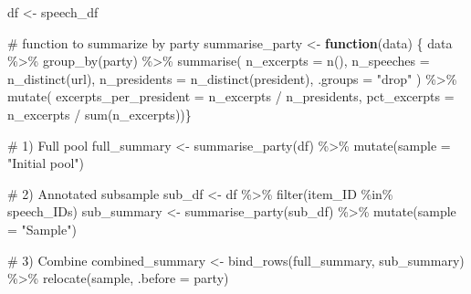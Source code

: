 \documentclass[
  man]{apa7}
\newenvironment{Shaded}{\begin{snugshade}}{\end{snugshade}}
\newcommand{\AttributeTok}[1]{\textcolor[rgb]{0.40,0.45,0.13}{#1}}
\newcommand{\CommentTok}[1]{\textcolor[rgb]{0.37,0.37,0.37}{#1}}
\newcommand{\ControlFlowTok}[1]{\textcolor[rgb]{0.00,0.23,0.31}{\textbf{#1}}}
\newcommand{\FunctionTok}[1]{\textcolor[rgb]{0.28,0.35,0.67}{#1}}
\newcommand{\NormalTok}[1]{\textcolor[rgb]{0.00,0.23,0.31}{#1}}
\newcommand{\OtherTok}[1]{\textcolor[rgb]{0.00,0.23,0.31}{#1}}
\newcommand{\SpecialCharTok}[1]{\textcolor[rgb]{0.37,0.37,0.37}{#1}}
\newcommand{\StringTok}[1]{\textcolor[rgb]{0.13,0.47,0.30}{#1}}
\begin{document}
\begin{Shaded}
\begin{Highlighting}[]
\NormalTok{df }\OtherTok{\textless{}{-}}\NormalTok{ speech\_df}

\CommentTok{\# function to summarize by party}
\NormalTok{summarise\_party }\OtherTok{\textless{}{-}} \ControlFlowTok{function}\NormalTok{(data) \{}
\NormalTok{  data }\SpecialCharTok{\%\textgreater{}\%}
    \FunctionTok{group\_by}\NormalTok{(party) }\SpecialCharTok{\%\textgreater{}\%}
    \FunctionTok{summarise}\NormalTok{(}
      \AttributeTok{n\_excerpts    =} \FunctionTok{n}\NormalTok{(),}
      \AttributeTok{n\_speeches    =} \FunctionTok{n\_distinct}\NormalTok{(url),}
      \AttributeTok{n\_presidents  =} \FunctionTok{n\_distinct}\NormalTok{(president),}
      \AttributeTok{.groups =} \StringTok{"drop"}
\NormalTok{    ) }\SpecialCharTok{\%\textgreater{}\%}
    \FunctionTok{mutate}\NormalTok{(}
      \AttributeTok{excerpts\_per\_president =}\NormalTok{ n\_excerpts }\SpecialCharTok{/}\NormalTok{ n\_presidents,}
      \AttributeTok{pct\_excerpts =}\NormalTok{ n\_excerpts }\SpecialCharTok{/} \FunctionTok{sum}\NormalTok{(n\_excerpts))\}}

\CommentTok{\# 1) Full pool}
\NormalTok{full\_summary }\OtherTok{\textless{}{-}} \FunctionTok{summarise\_party}\NormalTok{(df) }\SpecialCharTok{\%\textgreater{}\%}
  \FunctionTok{mutate}\NormalTok{(}\AttributeTok{sample =} \StringTok{"Initial pool"}\NormalTok{)}

\CommentTok{\# 2) Annotated subsample}
\NormalTok{sub\_df }\OtherTok{\textless{}{-}}\NormalTok{ df }\SpecialCharTok{\%\textgreater{}\%} \FunctionTok{filter}\NormalTok{(item\_ID }\SpecialCharTok{\%in\%}\NormalTok{ speech\_IDs)}
\NormalTok{sub\_summary }\OtherTok{\textless{}{-}} \FunctionTok{summarise\_party}\NormalTok{(sub\_df) }\SpecialCharTok{\%\textgreater{}\%}
  \FunctionTok{mutate}\NormalTok{(}\AttributeTok{sample =} \StringTok{"Sample"}\NormalTok{)}

\CommentTok{\# 3) Combine}
\NormalTok{combined\_summary }\OtherTok{\textless{}{-}} \FunctionTok{bind\_rows}\NormalTok{(full\_summary, sub\_summary) }\SpecialCharTok{\%\textgreater{}\%}
  \FunctionTok{relocate}\NormalTok{(sample, }\AttributeTok{.before =}\NormalTok{ party)}


\end{Highlighting}
\end{Shaded}
\end{document}
